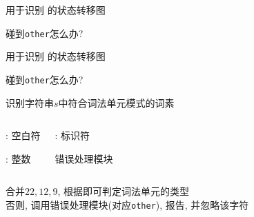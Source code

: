 \begin{frame}{}
  \begin{center}
    用于识别 \blue{\id} 的状态转移图

    \vspace{0.60cm}

    \pause
    \vspace{0.40cm}
     碰到\texttt{other}怎么办?
  \end{center}
\end{frame}

\begin{frame}{}
  \begin{center}
    用于识别 \blue{\intnum} 的状态转移图

    \pause
    \vspace{0.40cm}
     碰到\texttt{other}怎么办?
  \end{center}
\end{frame}

\begin{frame}{}
  \begin{center}
    识别字符串$s$中符合词法单元模式的词素
  \end{center}

  \begin{columns}
      \begin{center}
        \ws: 空白符

        \vspace{0.20cm}
        \intnum: 整数
      \end{center}
      \begin{center}
        \id: 标识符

        \vspace{0.40cm}
        错误处理模块
      \end{center}
  \end{columns}

  \pause
  \vspace{0.30cm}
  \begin{center}
     合并$22, 12, 9$, 根据即可判定词法单元的类型 \\[8pt]
    否则, 调用错误处理模块(对应\texttt{other}), 报告, 并忽略该字符
  \end{center}
\end{frame}

